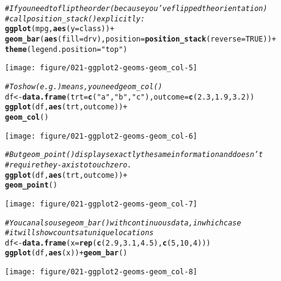 \documentclass[a4paper,titlepage]{tufte-handout}\usepackage[]{graphicx}\usepackage[]{xcolor}
\makeatletter
\def\maxwidth{ %
  \ifdim\Gin@nat@width>\linewidth
    \linewidth
  \else
    \Gin@nat@width
  \fi
}
\newcommand{\hlnum}[1]{\textcolor[rgb]{0.686,0.059,0.569}{#1}}%
\newcommand{\hlsng}[1]{\textcolor[rgb]{0.192,0.494,0.8}{#1}}%
\newcommand{\hlcom}[1]{\textcolor[rgb]{0.678,0.584,0.686}{\textit{#1}}}%
\newcommand{\hlopt}[1]{\textcolor[rgb]{0,0,0}{#1}}%
\newcommand{\hldef}[1]{\textcolor[rgb]{0.345,0.345,0.345}{#1}}%
\newcommand{\hlkwb}[1]{\textcolor[rgb]{0.69,0.353,0.396}{#1}}%
\newcommand{\hlkwc}[1]{\textcolor[rgb]{0.333,0.667,0.333}{#1}}%
\newcommand{\hlkwd}[1]{\textcolor[rgb]{0.737,0.353,0.396}{\textbf{#1}}}%
\newenvironment{kframe}{%
 \def\at@end@of@kframe{}%
 \ifinner\ifhmode%
  \def\at@end@of@kframe{\end{minipage}}%
  \begin{minipage}{\columnwidth}%
 \fi\fi%
 \def\FrameCommand##1{\hskip\@totalleftmargin \hskip-\fboxsep
 \colorbox{shadecolor}{##1}\hskip-\fboxsep
     \hskip-\linewidth \hskip-\@totalleftmargin \hskip\columnwidth}%
 \MakeFramed {\advance\hsize-\width
   \@totalleftmargin\z@ \linewidth\hsize
   \@setminipage}}%
 {\par\unskip\endMakeFramed%
 \at@end@of@kframe}
\newenvironment{knitrout}{}{} %
\makeatother
\begin{document}
\begin{knitrout}
\begin{kframe}
\begin{alltt}
\hlcom{# If you need to flip the order (because you've flipped the orientation)}
\hlcom{# call position_stack() explicitly:}
\hlkwd{ggplot}\hldef{(mpg,} \hlkwd{aes}\hldef{(}\hlkwc{y} \hldef{= class))} \hlopt{+}
 \hlkwd{geom_bar}\hldef{(}\hlkwd{aes}\hldef{(}\hlkwc{fill} \hldef{= drv),} \hlkwc{position} \hldef{=} \hlkwd{position_stack}\hldef{(}\hlkwc{reverse} \hldef{=} \hlnum{TRUE}\hldef{))} \hlopt{+}
 \hlkwd{theme}\hldef{(}\hlkwc{legend.position} \hldef{=} \hlsng{"top"}\hldef{)}
\end{alltt}
\end{kframe}
\texttt{[image: figure/021-ggplot2-geoms-geom\_col-5]} 
\begin{kframe}\begin{alltt}
\hlcom{# To show (e.g.) means, you need geom_col()}
\hldef{df} \hlkwb{<-} \hlkwd{data.frame}\hldef{(}\hlkwc{trt} \hldef{=} \hlkwd{c}\hldef{(}\hlsng{"a"}\hldef{,} \hlsng{"b"}\hldef{,} \hlsng{"c"}\hldef{),} \hlkwc{outcome} \hldef{=} \hlkwd{c}\hldef{(}\hlnum{2.3}\hldef{,} \hlnum{1.9}\hldef{,} \hlnum{3.2}\hldef{))}
\hlkwd{ggplot}\hldef{(df,} \hlkwd{aes}\hldef{(trt, outcome))} \hlopt{+}
  \hlkwd{geom_col}\hldef{()}
\end{alltt}
\end{kframe}
\texttt{[image: figure/021-ggplot2-geoms-geom\_col-6]} 
\begin{kframe}\begin{alltt}
\hlcom{# But geom_point() displays exactly the same information and doesn't}
\hlcom{# require the y-axis to touch zero.}
\hlkwd{ggplot}\hldef{(df,} \hlkwd{aes}\hldef{(trt, outcome))} \hlopt{+}
  \hlkwd{geom_point}\hldef{()}
\end{alltt}
\end{kframe}
\texttt{[image: figure/021-ggplot2-geoms-geom\_col-7]} 
\begin{kframe}\begin{alltt}
\hlcom{# You can also use geom_bar() with continuous data, in which case}
\hlcom{# it will show counts at unique locations}
\hldef{df} \hlkwb{<-} \hlkwd{data.frame}\hldef{(}\hlkwc{x} \hldef{=} \hlkwd{rep}\hldef{(}\hlkwd{c}\hldef{(}\hlnum{2.9}\hldef{,} \hlnum{3.1}\hldef{,} \hlnum{4.5}\hldef{),} \hlkwd{c}\hldef{(}\hlnum{5}\hldef{,} \hlnum{10}\hldef{,} \hlnum{4}\hldef{)))}
\hlkwd{ggplot}\hldef{(df,} \hlkwd{aes}\hldef{(x))} \hlopt{+} \hlkwd{geom_bar}\hldef{()}
\end{alltt}
\end{kframe}
\texttt{[image: figure/021-ggplot2-geoms-geom\_col-8]} 

\end{knitrout}
\end{document}
